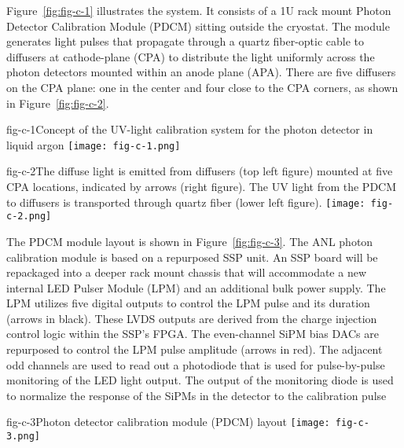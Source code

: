 Figure~\ref{fig:fig-c-1} illustrates the system. It
consists of a 1U rack mount Photon Detector Calibration Module (PDCM)
sitting outside the cryostat. The module generates light
pulses that propagate through a quartz fiber-optic cable to diffusers
at cathode-plane (CPA) to distribute the light uniformly across the
photon detectors mounted within an anode plane (APA).  There are five
diffusers on the CPA plane: one in the center and four close
to the CPA corners, as shown in Figure~\ref{fig:fig-c-2}. 

%
\begin{cdrfigure}{fig-c-1}{Concept of the UV-light calibration system for the photon
  detector in liquid argon} 
  \texttt{[image: fig-c-1.png]}
\end{cdrfigure}


\begin{cdrfigure}{fig-c-2}{The diffuse light is emitted from diffusers (top left figure)
  mounted at five CPA locations, indicated by arrows (right figure).
  The UV light from the PDCM to diffusers is transported through
  quartz fiber (lower left figure).}
\texttt{[image: fig-c-2.png]}
\end{cdrfigure}


The PDCM module layout is shown in Figure~\ref{fig:fig-c-3}. The ANL
photon calibration module is based on a repurposed SSP unit.  An SSP
board will be repackaged into a deeper rack mount chassis that will
accommodate a new internal LED Pulser Module (LPM) and an additional
bulk power supply. The LPM utilizes five digital outputs to control
the LPM pulse and its duration (arrows in black).  These LVDS outputs
are derived from the charge injection control logic within the SSP's
FPGA.  The even-channel SiPM bias DACs are repurposed to control the
LPM pulse amplitude (arrows in red).  The adjacent odd channels are
used to read out a photodiode that is used for pulse-by-pulse
monitoring of the LED light output.  The output of the monitoring
diode is used to normalize the response of the SiPMs in the detector
to the calibration pulse

\begin{cdrfigure}{fig-c-3}{Photon detector calibration module (PDCM) layout}
\texttt{[image: fig-c-3.png]}
\end{cdrfigure}


